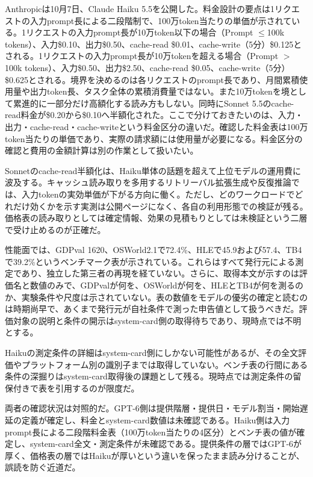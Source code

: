 Anthropicは10月7日、Claude Haiku 5.5を公開した。料金設計の要点は1リクエストの入力prompt長による二段階制で、100万token当たりの単価が示されている。1リクエストの入力prompt長が10万token以下の場合（Prompt $\le$100k tokens）、入力\$0.10、出力\$0.50、cache-read \$0.01、cache-write（5分）\$0.125とされる。1リクエストの入力prompt長が10万tokenを超える場合（Prompt $>$100k tokens）、入力\$0.50、出力\$2.50、cache-read \$0.05、cache-write（5分）\$0.625とされる。境界を決めるのは各リクエストのprompt長であり、月間累積使用量や出力token長、タスク全体の累積消費量ではない。また10万tokenを境として累進的に一部分だけ高額化する読み方もしない。同時にSonnet 5.5のcache-read料金が\$0.20から\$0.10へ半額化された。ここで分けておきたいのは、入力・出力・cache-read・cache-writeという料金区分の違いだ。確認した料金表は100万token当たりの単価であり、実際の請求額には使用量が必要になる。料金区分の確認と費用の金額計算は別の作業として扱いたい。\cite{haiku55}

Sonnetのcache-read半額化は、Haiku単体の話題を超えて上位モデルの運用費に波及する。キャッシュ読み取りを多用するリトリーバル拡張生成や反復推論では、入力tokenの実効単価が下がる方向に働く。ただし、どのワークロードでどれだけ効くかを示す実測は公開ページになく、各自の利用形態での検証が残る。価格表の読み取りとしては確定情報、効果の見積もりとしては未検証という二層で受け止めるのが正確だ。\cite{haiku55}

性能面では、GDPval 1620、OSWorld2.1で72.4\%、HLEで45.9および57.4、TB4で39.2\%というベンチマーク表が示されている。これらはすべて発行元による測定であり、独立した第三者の再現を経ていない。さらに、取得本文が示すのは評価名と数値のみで、GDPvalが何を、OSWorldが何を、HLEとTB4が何を測るのか、実験条件や尺度は示されていない。表の数値をモデルの優劣の確定と読むのは時期尚早で、あくまで発行元が自社条件で測った申告値として扱うべきだ。評価対象の説明と条件の開示はsystem-card側の取得待ちであり、現時点では不明とする。\cite{haiku55}

Haikuの測定条件の詳細はsystem-card側にしかない可能性があるが、その全文評価やプラットフォーム別の識別子までは取得していない。ベンチ表の行間にある条件の深掘りはsystem-card取得後の課題として残る。現時点では測定条件の留保付きで表を引用するのが限度だ。\cite{haiku55}

両者の確認状況は対照的だ。GPT-6側は提供階層・提供日・モデル割当・開始遅延の定義が確定し、料金とsystem-card数値は未確認である。Haiku側は入力prompt長による二段階料金表（100万token当たりの4区分）とベンチ表の値が確定し、system-card全文・測定条件が未確認である。提供条件の層ではGPT-6が厚く、価格表の層ではHaikuが厚いという違いを保ったまま読み分けることが、誤読を防ぐ近道だ。\cite{gpt6ui}\cite{haiku55}

